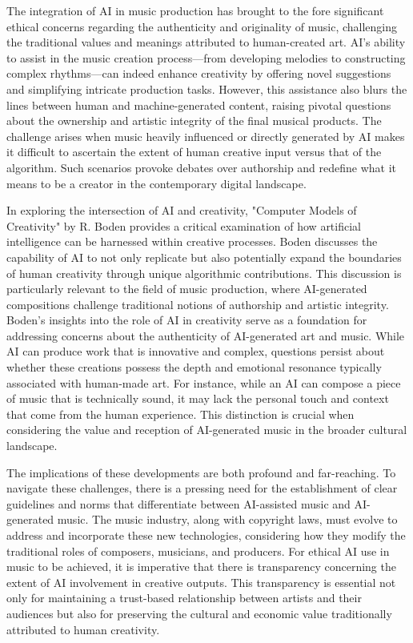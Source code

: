 \documentclass[10pt,twocolumn]{article}
\begin{document}
The integration of AI in music production has brought to the fore significant ethical concerns regarding the authenticity and originality of music, challenging the traditional values and meanings attributed to human-created art. AI's ability to assist in the music creation process—from developing melodies to constructing complex rhythms—can indeed enhance creativity by offering novel suggestions and simplifying intricate production tasks. However, this assistance also blurs the lines between human and machine-generated content, raising pivotal questions about the ownership and artistic integrity of the final musical products. The challenge arises when music heavily influenced or directly generated by AI makes it difficult to ascertain the extent of human creative input versus that of the algorithm. Such scenarios provoke debates over authorship and redefine what it means to be a creator in the contemporary digital landscape.

In exploring the intersection of AI and creativity, "Computer Models of Creativity" \cite{creativity} by R. Boden provides a critical examination of how artificial intelligence can be harnessed within creative processes. Boden discusses the capability of AI to not only replicate but also potentially expand the boundaries of human creativity through unique algorithmic contributions. This discussion is particularly relevant to the field of music production, where AI-generated compositions challenge traditional notions of authorship and artistic integrity. Boden's insights into the role of AI in creativity serve as a foundation for addressing concerns about the authenticity of AI-generated art and music. While AI can produce work that is innovative and complex, questions persist about whether these creations possess the depth and emotional resonance typically associated with human-made art. For instance, while an AI can compose a piece of music that is technically sound, it may lack the personal touch and context that come from the human experience. This distinction is crucial when considering the value and reception of AI-generated music in the broader cultural landscape.

The implications of these developments are both profound and far-reaching. To navigate these challenges, there is a pressing need for the establishment of clear guidelines and norms that differentiate between AI-assisted music and AI-generated music. The music industry, along with copyright laws, must evolve to address and incorporate these new technologies, considering how they modify the traditional roles of composers, musicians, and producers. For ethical AI use in music to be achieved, it is imperative that there is transparency concerning the extent of AI involvement in creative outputs. This transparency is essential not only for maintaining a trust-based relationship between artists and their audiences but also for preserving the cultural and economic value traditionally attributed to human creativity.
\end{document}
